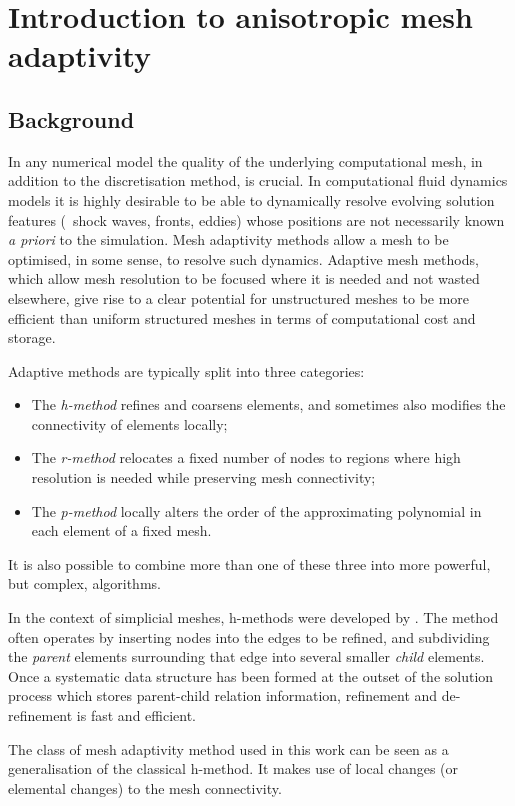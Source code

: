 \chapter{Introduction to anisotropic mesh adaptivity}

\section{Background}
In any numerical model the quality of the underlying computational
mesh, in addition to the discretisation method, is crucial. In
computational fluid dynamics models it is highly desirable to be able
to dynamically resolve evolving solution features (\eg\ shock waves,
fronts, eddies) whose positions are not necessarily known {\it a
  priori} to the simulation. Mesh adaptivity methods allow a mesh to
be optimised, in some sense, to resolve such dynamics. Adaptive mesh
methods, which allow mesh resolution to be focused where it is needed
and not wasted elsewhere, give rise to a clear potential for
unstructured meshes to be more efficient than uniform structured
meshes in terms of computational cost and storage.

Adaptive methods are typically split into three categories:
\begin{itemize}
\item The {\it h-method} refines and coarsens elements, and sometimes
  also modifies the connectivity of elements locally;
\item The {\it r-method} relocates a fixed number of nodes to regions
  where high resolution is needed while preserving mesh connectivity;
\item The {\it p-method} locally alters the order of the approximating
  polynomial in each element of a fixed mesh.
\end{itemize}
It is also possible to combine more than one of these three into more
powerful, but complex, algorithms.

In the context of simplicial meshes, h-methods were developed by
\citep{rivara1984a, rivara1984b, lohner1992, ong1994,
  speares1997}. The method often operates by inserting nodes into the
edges to be refined, and subdividing the {\it parent} elements
surrounding that edge into several smaller {\it child} elements. Once
a systematic data structure has been formed at the outset of the
solution process which stores parent-child relation information,
refinement and de-refinement is fast and efficient.

The class of mesh adaptivity method used in this work can be seen
as a generalisation of the classical h-method. It makes use of local
changes (or elemental changes) to the mesh connectivity.

